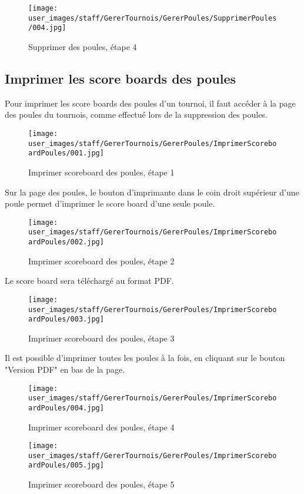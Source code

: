 \begin{figure}[H]
\centering
\texttt{[image: user\_images/staff/GererTournois/GererPoules/SupprimerPoules/004.jpg]}
\caption{Supprimer des poules, étape 4}
\end{figure}

\subsection{Imprimer les score boards des poules}

Pour imprimer les score boards des poules d'un tournoi, il faut accéder à la page des poules du tournois, comme effectué lors de la suppression des poules.

\begin{figure}[H]
\centering
\texttt{[image: user\_images/staff/GererTournois/GererPoules/ImprimerScoreboardPoules/001.jpg]}
\caption{Imprimer scoreboard des poules, étape 1}
\end{figure}

Sur la page des poules, le bouton d'imprimante dans le coin droit supérieur d'une poule permet d'imprimer le score board d'une seule poule.

\begin{figure}[H]
\centering
\texttt{[image: user\_images/staff/GererTournois/GererPoules/ImprimerScoreboardPoules/002.jpg]}
\caption{Imprimer scoreboard des poules, étape 2}
\end{figure}

Le score board sera téléchargé au format PDF.

\begin{figure}[H]
\centering
\texttt{[image: user\_images/staff/GererTournois/GererPoules/ImprimerScoreboardPoules/003.jpg]}
\caption{Imprimer scoreboard des poules, étape 3}
\end{figure}

Il est possible d'imprimer toutes les poules à la fois, en cliquant sur le bouton "Version PDF" en bas de la page.

\begin{figure}[H]
\centering
\texttt{[image: user\_images/staff/GererTournois/GererPoules/ImprimerScoreboardPoules/004.jpg]}
\caption{Imprimer scoreboard des poules, étape 4}
\end{figure}

\begin{figure}[H]
\centering
\texttt{[image: user\_images/staff/GererTournois/GererPoules/ImprimerScoreboardPoules/005.jpg]}
\caption{Imprimer scoreboard des poules, étape 5}
\end{figure}

